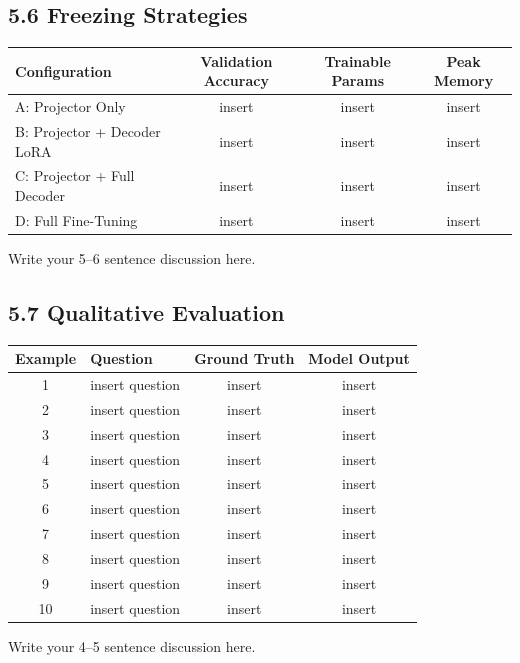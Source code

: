 \documentclass[11pt]{article}
\begin{document}
\subsection*{5.6 Freezing Strategies}

\begin{center}
\begin{tabular}{l c c c}
\toprule
Configuration & Validation Accuracy & Trainable Params & Peak Memory \\
\midrule
A: Projector Only & insert & insert & insert \\
B: Projector + Decoder LoRA & insert & insert & insert \\
C: Projector + Full Decoder & insert & insert & insert \\
D: Full Fine-Tuning & insert & insert & insert \\
\bottomrule
\end{tabular}
\end{center}

Write your 5--6 sentence discussion here.

\subsection*{5.7 Qualitative Evaluation}

\begin{center}
\begin{tabular}{c p{4cm} c c}
\toprule
Example & Question & Ground Truth & Model Output \\
\midrule
1 & insert question & insert & insert \\
2 & insert question & insert & insert \\
3 & insert question & insert & insert \\
4 & insert question & insert & insert \\
5 & insert question & insert & insert \\
6 & insert question & insert & insert \\
7 & insert question & insert & insert \\
8 & insert question & insert & insert \\
9 & insert question & insert & insert \\
10 & insert question & insert & insert \\
\bottomrule
\end{tabular}
\end{center}

Write your 4--5 sentence discussion here.
\end{document}
